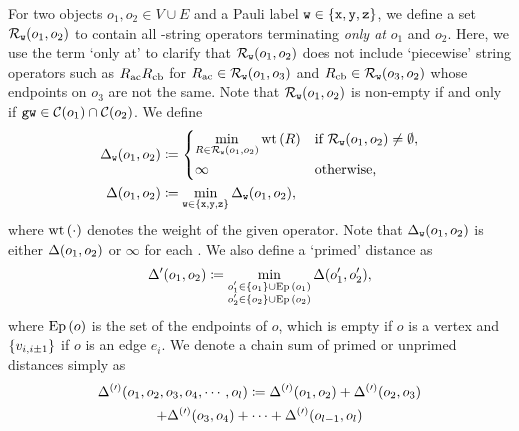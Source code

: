 \documentclass[
 prx,
 reprint,
 superscriptaddress,
 longbibliography,
 dvipsnames
]{revtex4-2}
\begin{document}
For two objects $o_1, o_2 \in V \cup E$ and a Pauli label $\texttt{w} \in \qty{\texttt{x}, \texttt{y}, \texttt{z}}$, we define a set $\mathcal{R}_{\texttt{w}}\qty(o_1, o_2)$ to contain all \gw-string operators terminating \emph{only at} $o_1$ and $o_2$.
Here, we use the term `only at' to clarify that $\mathcal{R}_{\texttt{w}}\qty(o_1, o_2)$ does not include `piecewise' string operators such as $R_{\mathrm{ac}} R_{\mathrm{cb}}$ for $R_{\mathrm{ac}} \in \mathcal{R}_{\texttt{w}}\qty(o_1, o_3)$ and $R_{\mathrm{cb}} \in \mathcal{R}_{\texttt{w}}\qty(o_3, o_2)$ whose endpoints on $o_3$ are not the same.
Note that $\mathcal{R}_{\texttt{w}}\qty(o_1, o_2)$ is non-empty if and only if $\texttt{g}\texttt{w} \in \mathcal{C}\qty(o_1) \cap \mathcal{C}\qty(o_2)$.
We define
\begin{align*}
    \Delta_{\texttt{w}}\qty(o_1, o_2) &\coloneqq \begin{dcases}
        \min_{R \in \mathcal{R}_{\texttt{w}}\qty(o_1, o_2)} \operatorname{wt}\qty(R) & \text{if } \mathcal{R}_{\texttt{w}}\qty(o_1, o_2) \neq \emptyset, \\ 
        \infty & \text{otherwise,}
    \end{dcases} \\ 
    \Delta\qty(o_1,o_2) &\coloneqq \min_{\texttt{w} \in \qty{\texttt{x}, \texttt{y}, \texttt{z}}} \Delta_{\texttt{w}}\qty(o_1, o_2),
\end{align*}
where $\operatorname{wt}\qty(\cdot)$ denotes the weight of the given operator.
Note that $\Delta_{\texttt{w}}\qty(o_1, o_2)$ is either $\Delta\qty(o_1,o_2)$ or $\infty$ for each \wbs.
We also define a `primed' distance as
\begin{align}
    \Delta'\qty(o_1, o_2) \coloneqq \min_{\substack{o'_1 \in \qty{o_1} \cup \operatorname{Ep}\qty(o_1) \\ o'_2 \in \qty{o_2} \cup \operatorname{Ep}\qty(o_2)}} \Delta\qty(o'_1, o'_2),
    \label{eq:primed_distance}
\end{align}
where $\operatorname{Ep}\qty(o)$ is the set of the endpoints of $o$, which is empty if $o$ is a vertex and $\qty{v_{i,i\pm1}}$ if $o$ is an edge $e_i$.
We denote a chain sum of primed or unprimed distances simply as
\begin{multline*}
    \Delta^{(\prime)}\qty(o_1, o_2, o_3, o_4, \cdots, o_l) \coloneqq \Delta^{(\prime)}\qty(o_1,o_2) + \Delta^{(\prime)}\qty(o_2,o_3) \\
    + \Delta^{(\prime)}\qty(o_3,o_4) + \cdots + \Delta^{(\prime)}\qty(o_{l-1},o_l)
\end{multline*}
\end{document}
